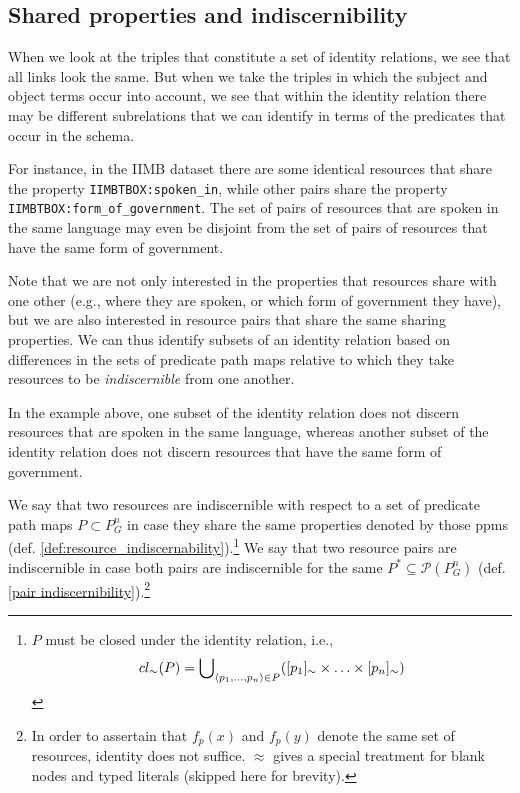 \subsection{Shared properties and indiscernibility}
\label{sec:indiscernibility}

When we look at the triples that constitute a set of identity relations,
  we see that all links look the same.
But when we take the triples in which the subject and object terms occur
  into account, we see that within the identity relation there may be
  different subrelations that we can identify in terms of the predicates
  that occur in the schema.

For instance, in the IIMB dataset there are some identical resources that
  share the property \verb|IIMBTBOX:spoken_in|, while other pairs share
  the property \verb|IIMBTBOX:form_of_government|.
The set of pairs of resources that are spoken in the same language may even
  be disjoint from the set of pairs of resources that have the same
  form of government.

Note that we are not only interested in the properties that resources share
  with one other (e.g., where they are spoken, or which form of government
  they have), but we are also interested in resource pairs that share
  the same sharing properties.
We can thus identify subsets of an identity relation based on differences
  in the sets of predicate path maps relative to which they take resources
  to be \emph{indiscernible} from one another.

In the example above, one subset of the identity relation does not discern
  resources that are spoken in the same language, whereas another subset
  of the identity relation does not discern resources that have the same
  form of government.

We say that two resources are indiscernible with respect to
  a set of predicate path maps $P \subset P_G^n$
  in case they share the same properties denoted by those ppms
  (def. \ref{def:resource_indiscernability}).\footnote{
    $P$ must be closed under the identity relation, i.e.,
    \begin{equation*}
      cl_{\sim}(P) = \bigcup_{\langle p_1,\ldots,p_n\rangle \in P}\nolimits (
        [p_1]_{\sim} \times \ldots \times [p_n]_{\sim}
      )
    \end{equation*}}
We say that two resource pairs are indiscernible
  in case both pairs are indiscernible for the same
  $P^* \subseteq \mathcal{P}(P_G^n)$
  (def. \ref{pair indiscernibility}).\footnote{
    In order to assertain that $f_p(x)$ and $f_p(y)$ denote
      the same set of resources, identity does not suffice.
      $\approx$ gives a special treatment for blank nodes and
      typed literals (skipped here for brevity).
  }

